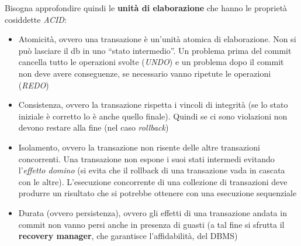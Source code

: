 \documentclass[a4paper,12pt, oneside]{book}
\begin{document}
Bisogna approfondire quindi le \textbf{unità di elaborazione} che hanno le
proprietà cosiddette \textit{ACID}:
\begin{itemize}
  \item Atomicità, ovvero una transazione è un'unità atomica di
  elaborazione. Non si può lasciare il db in uno ``stato 
  intermedio''. Un problema prima del commit cancella tutto le operazioni svolte
  (\textit{UNDO}) e un problema dopo il commit non deve avere conseguenze, se
  necessario vanno ripetute le operazioni (\textit{REDO}) 
  \item Consistenza, ovvero la transazione rispetta i vincoli di integrità (se
  lo stato iniziale è corretto lo è anche quello finale). Quindi se ci sono
  violazioni non devono restare alla fine (nel caso \textit{rollback})
  \item Isolamento, ovvero la transazione non risente delle altre transazioni
  concorrenti. Una transazione non espone i suoi stati intermedi evitando
  l'\textit{effetto domino} (si evita che il rollback di una transazione vada in
  cascata con le altre). L'esecuzione concorrente di una collezione di
  transazioni deve produrre un risultato che si potrebbe ottenere con una
  esecuzione sequenziale
  \item Durata (ovvero persistenza), ovvero gli effetti di una transazione
  andata in commit non vanno persi anche in presenza di guasti (a tal fine si
  sfrutta il \textbf{recovery manager}, che garantisce l'affidabilità, del DBMS)
\end{itemize}
\end{document}
